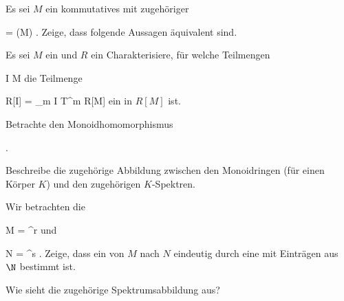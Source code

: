 {}
{





Es sei $M$ ein kommutatives
mit zugehöriger

\mavergleichskette
{\vergleichskette
{ \Gamma
}
{ = }{ \Gamma(M)
}
{  }{
}
{    }{
}
{   }{
}
}
{}{}{.}
Zeige, dass folgende Aussagen äquivalent sind.





}
{} {}

{}
{





Es sei $M$ ein
und $R$ ein
Charakterisiere, für welche Teilmengen

\mavergleichskette
{\vergleichskette
{ I
}
{ \subseteq }{ M
}
{  }{
}
{    }{
}
{   }{
}
}
{}{}{}
die Teilmenge

\mavergleichskettedisp
{\vergleichskette
{ R[I]
}
{ =} { \bigoplus_{m \in I} T^m
}
{ \subseteq} { R[M]
}
{ } {
}
{ } {
}
}
{}{}{}
ein
in $R[M]$ ist.





}
{} {}

{}
{





Betrachte den Monoidhomomorphismus

 { . }

Beschreibe die zugehörige Abbildung zwischen den Monoidringen (für einen Körper $K$) und den zugehörigen $K$-Spektren.





}
{} {}

{}
{





Wir betrachten die

\mavergleichskette
{\vergleichskette
{ M
}
{ = }{ \N^r
}
{  }{
}
{    }{
}
{   }{
}
}
{}{}{}
und

\mavergleichskette
{\vergleichskette
{ N
}
{ = }{ \N^s
}
{  }{
}
{    }{
}
{   }{
}
}
{}{}{.}
Zeige, dass ein
von $M$ nach $N$ eindeutig durch eine
 {} {}
mit Einträgen aus $\N$ bestimmt ist.





}
{Wie sieht die zugehörige Spektrumsabbildung aus?} {}

